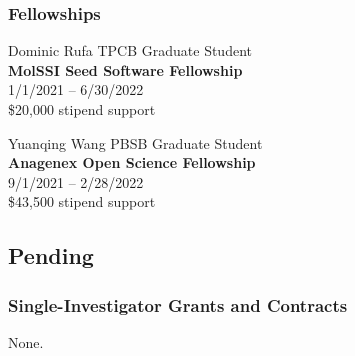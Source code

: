 \documentclass[10pt]{article}
\begin{document}
\subsubsection*{Fellowships}

Dominic Rufa TPCB Graduate Student\\
{\bf MolSSI Seed Software Fellowship}\\
1/1/2021 -- 6/30/2022\\
\$20,000 stipend support

\vspace{1.5ex} 

Yuanqing Wang PBSB Graduate Student\\
{\bf Anagenex Open Science Fellowship}\\
9/1/2021 -- 2/28/2022\\
\$43,500 stipend support


\eject
\subsection*{Pending}

\subsubsection*{Single-Investigator Grants and Contracts}

None.


%
%
%
\end{document}
